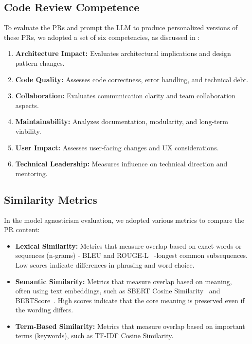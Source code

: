 \documentclass[conference]{IEEEtran}
\begin{document}
\subsection{Code Review Competence}\label{sec:competence} 
To evaluate the PRs and prompt the LLM to produce personalized versions of these PRs, we adopted a set of six competencies, as discussed in \cite{wurzel2023competencies}:
\begin{enumerate}
 \item \textbf{Architecture Impact:} \label{comp:architecture} Evaluates architectural implications and design pattern changes.

    \item \textbf{Code Quality:} \label{comp:codequality} Assesses code correctness, error handling, and technical debt.

    \item \textbf{Collaboration:} \label{comp:collaboration} Evaluates communication clarity and team collaboration aspects.

    \item \textbf{Maintainability:} \label{comp:maintainability} Analyzes documentation, modularity, and long-term viability.

    \item \textbf{User Impact:} \label{comp:userimpact} Assesses user-facing changes and UX considerations.

    \item \textbf{Technical Leadership:} \label{comp:techleadership} Measures influence on technical direction and mentoring.
    \end{enumerate}

\subsection{Similarity Metrics}\label{sec:similarity-metrics}

In the model agnosticism evaluation, we adopted various metrics to compare the PR content:
\begin{itemize}
    \item \textbf{Lexical Similarity:} Metrics that measure overlap based on exact words or sequences (n-grams) - BLEU\cite{papineni2002bleu} and ROUGE-L~\cite{lin2004rouge} -longest common subsequences. Low scores indicate differences in phrasing and word choice.
    \item \textbf{Semantic Similarity:} Metrics that measure overlap based on meaning, often using text embeddings, such as SBERT Cosine Similarity~\cite{papineni2002bleu} and BERTScore~\cite{zhang2020bertscore}. High scores indicate that the core meaning is preserved even if the wording differs.
    \item \textbf{Term-Based Similarity:} Metrics that measure overlap based on important terms (keywords), such as TF-IDF Cosine Similarity.
\end{itemize}
\end{document}
